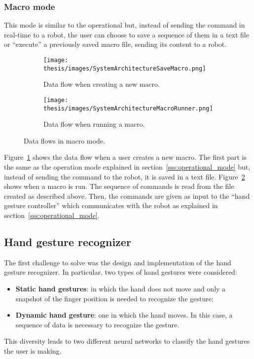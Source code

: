 \documentclass[../thesis.tex]{subfiles}
\begin{document}
\subsubsection{Macro mode}
This mode is similar to the operational but, instead of sending the command in real-time to a robot, the user can choose to save a sequence of them in a text file or ``execute'' a previously saved macro file, sending its content to a robot. 
\begin{figure}[H]
    \centering

    \begin{subfigure}{\textwidth}
        \texttt{[image: thesis/images/SystemArchitectureSaveMacro.png]}
        \caption{Data flow when creating a new macro.}
        \label{fig:system_architecture_save_macro}
    \end{subfigure}
    \hfill
    \begin{subfigure}{\textwidth}
        \texttt{[image: thesis/images/SystemArchitectureMacroRunner.png]}
        \caption{Data flow when running a macro.}
        \label{fig:system_architecture_run_macro}
    \end{subfigure}
    
    \caption{Data flows in macro mode.}
    \label{fig:macro_data_flows}
\end{figure}
Figure~\ref{fig:system_architecture_save_macro} shows the data flow when a user creates a new macro. The first part is the same as the operation mode explained in section~\ref{sss:operational_mode} but, instead of sending the command to the robot, it is saved in a text file. Figure~\ref{fig:system_architecture_run_macro} shows when a macro is run. The sequence of commands is read from the file created as described above. Then, the commands are given as input to the ``hand gesture controller'' which communicates with the robot as explained in section~\ref{sss:operational_mode}.

\subsection{Hand gesture recognizer}
The first challenge to solve was the design and implementation of the hand gesture recognizer. In particular, two types of hand gestures were considered: 
\begin{itemize}
    \item \textbf{Static hand gestures}: in which the hand does not move and only a snapshot of the finger position is needed to recognize the gesture;
    \item \textbf{Dynamic hand gesture}: one in which the hand moves. In this case, a sequence of data is necessary to recognize the gesture. 
\end{itemize}
This diversity leads to two different neural networks to classify the hand gestures the user is making. 
\end{document}
